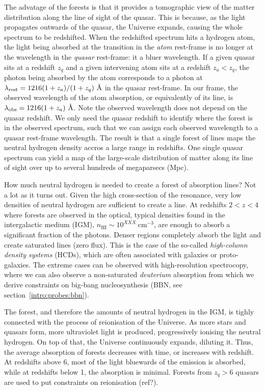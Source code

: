 The advatage of the forests is that it provides a tomographic 
view of the matter distribution along the line of sight of the quasar. 
This is because, as the light propagates outwards of the quasar, the 
Universe expands, causing the whole spectrum to be redshifted. 
When the redshifted spectrum hits a hydrogen atom, the light being
absorbed at the \lya transition in the \emph{atom} rest-frame 
is no longer at the \lya wavelength in the \emph{quasar} rest-frame:
it a bluer wavelength. If a given quasar sits at a redshift $z_q$ and 
a given intervening atom sits at a redshift $z_a < z_q$, the \lya photon being absorbed
by the atom corresponds to a photon at $\lambda_\mathrm{rest}= 1216(1+z_a)/(1+z_q)~\angstrom$
in the quasar rest-frame. In our frame, the observed wavelength of the 
atom absorption, or equivalently of its \lya line, is 
$\lambda_\mathrm{obs}= 1216(1+z_a)~\angstrom$. Note the 
observed wavelength does not depend on the quasar redshift.
We only need the quasar redshift to identify where the \lya forest is 
in the observed spectrum, such that we can assign each observed wavelength
to a quasar rest-frame wavelength. 
The result is that a single forest of lines maps the neutral
hydrogen density accros a large range in redshifts. One single
quasar spectrum can yield a map of the large-scale distribution 
of matter along its line of sight over up to several hundreds of 
megaparsecs (Mpc). 

How much neutral hydrogen is needed to create a forest of \lya 
absorption lines? Not a lot as it turns out. Given the 
high cross-section of the \lya resonance, very low densities of neutral 
hydrogen are sufficient to create a line. 
At redshifts $2 < z < 4$ where \lya forests are observed in the optical, 
typical densities found in the intergalactic medium (IGM), $n_\mathrm{HI} \sim 10^{XXX}~\si{\cm}^{-3}$,
are enough to absorb a significant fraction of the photons. 
Denser regions completely absorb the light and create saturated lines (zero flux). 
This is the case of the so-called \emph{high-column density systems} (HCDs), 
which are often associated with galaxies or proto-galaxies. The extreme cases 
can be observed with high-resolution spectrocopy, where we can also observe a non-saturated
\emph{deuterium} absorption from which we derive constraints on big-bang nucleosynthesis (BBN, 
see section~\ref{intro:probes:bbn}). 

The \lya forest, and therefore the amounts of neutral hydrogen in the IGM, 
is tighly connected with the process of reionisation of the Universe. 
As more stars and quasars form, more ultraviolet light is produced, 
progressively ionising the neutral hydrogen. On top of that, the Universe
continuously expands, diluting it. 
Thus, the average absorption of forests decreases with time, or increases with redshift.
At redshifts above 6, most of the light bluewards of the \lya emission is absorbed, 
while at redshifts below 1, the \lya absorption is minimal. 
Forests from $z_q>6$ quasars are used to put constraints on reionisation (ref?). 

